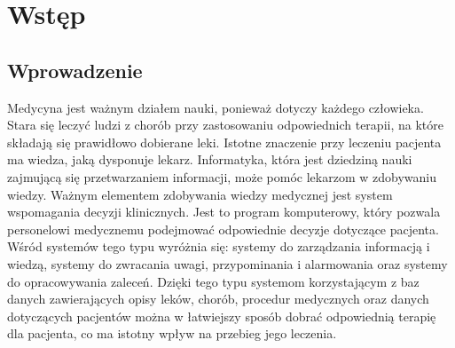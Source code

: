 \chapter{Wstęp}
\section{Wprowadzenie}

\begin{spacing}{1.5}
Medycyna jest ważnym działem nauki, ponieważ dotyczy każdego człowieka. 
Stara się leczyć ludzi z chorób przy zastosowaniu odpowiednich terapii, na które składają się prawidłowo dobierane leki. Istotne znaczenie przy leczeniu pacjenta ma wiedza, jaką dysponuje lekarz. Informatyka, która jest dziedziną nauki zajmującą się przetwarzaniem informacji, może pomóc lekarzom w zdobywaniu wiedzy. 
Ważnym elementem zdobywania wiedzy medycznej jest system wspomagania decyzji klinicznych. Jest to program komputerowy, który pozwala personelowi medycznemu podejmować odpowiednie decyzje dotyczące pacjenta. Wśród systemów tego typu wyróżnia się: 
systemy do zarządzania informacją i wiedzą, systemy do zwracania uwagi, przypominania i alarmowania oraz systemy do opracowywania zaleceń.
Dzięki tego typu systemom korzystającym z baz danych zawierających opisy leków, chorób, procedur medycznych oraz danych dotyczących pacjentów można w łatwiejszy sposób dobrać odpowiednią terapię dla pacjenta, co ma istotny wpływ na przebieg jego leczenia. 


\end{spacing}

